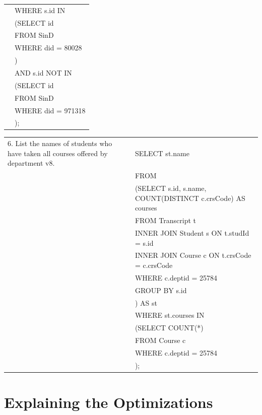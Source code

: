 \documentclass[11pt]{report}
\newcommand\tab[1][1cm]{\hspace*{#1}}
\begin{document}
\begin{flushleft}
\begin{tabular}{m{15em}|m{27.5em}}
			& WHERE s.id IN \\
			& \tab (SELECT id \\
			& \tab FROM SinD \\
			& \tab WHERE did = 80028 \\
			& \tab ) \\
			& \tab AND s.id NOT IN \\
			& \tab (SELECT id \\
			& \tab FROM SinD \\
			& \tab WHERE did = 971318 \\
			& \tab ); \\
		\end{tabular}
	\end{flushleft}

	\begin{flushleft}
		\begin{tabular}{m{15em}|m{27.5em}}
			\multirow{1}{15em}{6. List the names of students who have taken all courses offered 
			by department v8.} 
			& SELECT st.name \\ 
			& FROM \\ 
			& \tab (SELECT s.id, s.name, COUNT(DISTINCT c.crsCode) AS courses \\
			& \tab FROM Transcript t \\
			& \tab INNER JOIN Student s ON t.studId = s.id \\
			& \tab INNER JOIN Course c ON t.crsCode = c.crsCode \\
			& \tab WHERE c.deptid = 25784 \\
			& \tab GROUP BY s.id \\
			& \tab ) AS st \\
			& WHERE st.courses IN \\
			& \tab (SELECT COUNT(*) \\
			& \tab FROM Course c \\
			& \tab WHERE c.deptid = 25784 \\
			& \tab ); \\
		\end{tabular}
	\end{flushleft}

\section*{Explaining the Optimizations}
\end{document}
